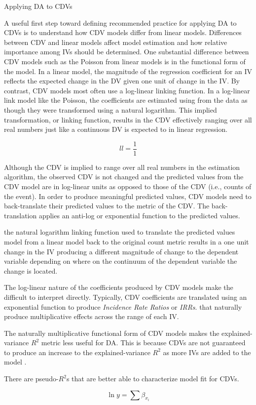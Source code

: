 \documentclass[ShortAfour,times,sageapa]{sagej}
\begin{document}
	
	

	Applying DA to CDVs


	A useful first step toward defining recommended practice for applying DA to CDVs is to understand how CDV models differ from linear models.
	Differences between CDV and linear models affect model estimation and how relative importance among IVs should be determined.	
	One substantial difference between CDV models such as the Poisson from linear models is in the functional form of the model. 
	In a linear model, the magnitude of the regression coefficient for an IV reflects the expected change in the DV given one unit of change in the IV. 
	By contrast, CDV models most often use a log-linear linking function.
  	In a log-linear link model like the Poisson, the coefficients are estimated using from the data as though they were transformed using a natural logarithm.  This implied transformation, or linking function, results in the CDV effectively ranging over all real numbers just like a continuous DV is expected to in linear regression.
  	
  	\begin{equation}
  		ll = \frac{1}{1}
  	\end{equation}
  	
  	Although the CDV is implied to range over all real numbers in the estimation algorithm, the observed CDV is not changed and the predicted values from the CDV model are in log-linear units as opposed to those of the CDV (i.e., counts of the event).  	
  	In order to produce meaningful predicted values, CDV models need to back-translate their predicted values to the metric of the CDV.  The back-translation applies an anti-log or exponential function to the predicted values.
  	 
  	the natural logarithm linking function used to translate the predicted values
  	model from a linear model back to the original count metric results in a one unit change in the IV producing a different magnitude of change to the dependent variable depending on where on the continuum of the dependent variable the change is located. 

	The log-linear nature of the coefficients produced by CDV models make the difficult to interpret directly. 
	Typically, CDV coefficients are translated using an exponential function to produce \emph{Incidence Rate Ratios} or \emph{IRRs}.  
	that naturally produce multiplicative effects across the range of each IV.

	The naturally multiplicative functional form of CDV models makes the explained-variance $R^2$ metric less useful for DA.  This is because CDVs are not guaranteed to produce an increase to the explained-variance $R^2$ as more IVs are added to the model \cite{}.  
	
	There are pseudo-$R^2$s that are better able to characterize model fit for CDVs.  
	
	
	\begin{equation}
		\ln{y} = \sum{\beta_{x_i}}
	\end{equation}




	
\end{document}
